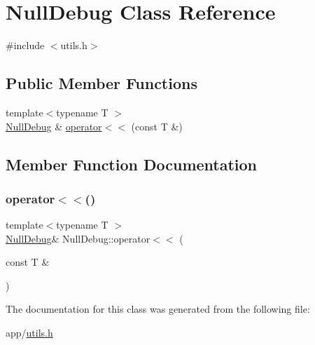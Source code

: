\hypertarget{class_null_debug}{}\section{Null\+Debug Class Reference}
\label{class_null_debug}


{\ttfamily \#include $<$utils.\+h$>$}

\subsection*{Public Member Functions}
\begin{DoxyCompactItemize}
\item 
{\footnotesize template$<$typename T $>$ }\\\hyperlink{class_null_debug}{Null\+Debug} \& \hyperlink{class_null_debug_a51f2c613f1937fc05c9b1c74e53253f9}{operator$<$$<$} (const T \&)
\end{DoxyCompactItemize}


\subsection{Member Function Documentation}
\hypertarget{class_null_debug_a51f2c613f1937fc05c9b1c74e53253f9}{}\label{class_null_debug_a51f2c613f1937fc05c9b1c74e53253f9} 
\subsubsection{\texorpdfstring{operator$<$$<$()}{operator<<()}}
{\footnotesize\ttfamily template$<$typename T $>$ \\
\hyperlink{class_null_debug}{Null\+Debug}\& Null\+Debug\+::operator$<$$<$ (\begin{DoxyParamCaption}\item[{const T \&}]{ }\end{DoxyParamCaption})\hspace{0.3cm}{\ttfamily [inline]}}



The documentation for this class was generated from the following file\+:\begin{DoxyCompactItemize}
\item 
app/\hyperlink{utils_8h}{utils.\+h}\end{DoxyCompactItemize}
